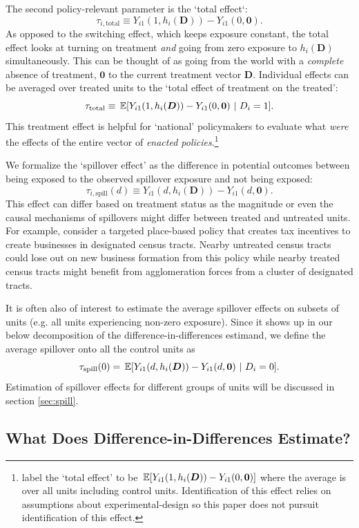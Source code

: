 The second policy-relevant parameter is the `total effect`: 
\[
  \tau_{i,\text{total}} \equiv Y_{i1}(1, h_i(\bm{D})) - Y_{i1}(0, \bm{0}).
\]
As opposed to the switching effect, which keeps exposure constant, the total effect looks at turning on treatment \textit{and} going from zero exposure to $h_i(\bm{D})$ simultaneously. This can be thought of as going from the world with a \textit{complete} absence of treatment, $\bm{0}$ to the current treatment vector $\bm{D}$. Individual effects can be averaged over treated units to the `total effect of treatment on the treated': 
\[
  \tau_{\text{total}} \equiv \expec{Y_{i1}(1, h_i(\bm{D})) - Y_{i1}(0, \bm{0}) \ \vert \ D_i = 1}.
\]
This treatment effect is helpful for `national' policymakers to evaluate what \textit{were} the effects of the entire vector of \textit{enacted policies}.\footnote{\citet{yu2022estimating} label the `total effect' to be $\expec{Y_{i1}(1, h_i(\bm{D})) - Y_{i1}(0, \bm{0})}$ where the average is over all units including control units. Identification of this effect relies on assumptions about experimental-design so this paper does not pursuit identification of this effect.} 

We formalize the `spillover effect' as the difference in potential outcomes between being exposed to the observed spillover exposure and not being exposed:
\[
  \tau_{i,\text{spill}}(d) \equiv Y_{i1}(d, h_i(\bm{D})) - Y_{i1}(d, \bm{0}).
\]
This effect can differ based on treatment status as the magnitude or even the causal mechanisms of spillovers might differ between treated and untreated units. For example, consider a targeted place-based policy that creates tax incentives to create businesses in designated census tracts. Nearby untreated census tracts could lose out on new business formation from this policy while nearby treated census tracts might benefit from agglomeration forces from a cluster of designated tracts. 

It is often also of interest to estimate the average spillover effects on subsets of units (e.g. all units experiencing non-zero exposure). Since it shows up in our below decomposition of the difference-in-differences estimand, we define the average spillover onto all the control units as
\[
  \tau_{\text{spill}}(0) = \expec{Y_{i1}(d, h_i(\bm{D})) - Y_{i1}(d, \bm{0})}{D_i = 0}.
\]
Estimation of spillover effects for different groups of units will be discussed in section \ref{sec:spill}.


\subsection{What Does Difference-in-Differences Estimate?}

